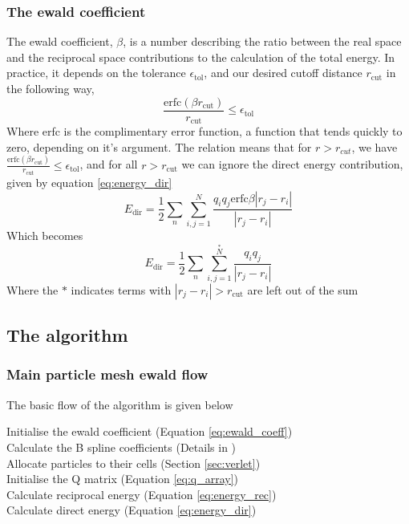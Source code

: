 \documentclass[pdftex,twoside,a4paper]{report}
\begin{document}
\subsubsection{The ewald coefficient}
The ewald coefficient, $\beta$, is a number describing the ratio between the real space and the reciprocal space contributions to the calculation of the total energy. In practice, it depends on the tolerance $\epsilon_\text{tol}$, and our desired cutoff distance $r_{\text{cut}}$ in the following way, \cite{darden:10089} \cite{essmann:8577}\\
\begin{equation}
\frac{\text{erfc}(\beta r_{\text{cut}})}{r_\text{cut}} \leq \epsilon_\text{tol}
\label{eq:ewald_coeff}
\end{equation}
Where erfc is the complimentary error function, a function that tends quickly to zero, depending on it's argument. The relation means that for $r > r_{cut}$, we have $\frac{\text{erfc}(\beta r_{\text{cut}})}{r_\text{cut}} \leq \epsilon_\text{tol}$, and for all $r > r_\text{cut}$ we can ignore the direct energy contribution, given by equation \ref{eq:energy_dir} \cite{essmann:8577}\\
\begin{equation}
E_\text{dir} = \frac{1}{2} \sum_{n} \sum_{i,j = 1} ^N \frac{q_i q_j \text{erfc}{\beta |r_j - r_i|}}{|r_j - r_i|}
\label{eq:energy_dir}
\end{equation}
Which becomes
\begin{equation}
E_\text{dir} = \frac{1}{2} \sum_{n} \sum_{i,j = 1} ^{\overset{*}{N}} \frac{q_i q_j}{|r_j - r_i|}
\label{eq:energy_dir_noerfc}
\end{equation}
Where the $*$ indicates terms with $|r_j - r_i| > r_{\text{cut}}$ are left out of the sum
\subsection{The algorithm}
\subsubsection{Main particle mesh ewald flow}
The basic flow of the algorithm is given below\\ \newline
\begin{algorithm}[H]
\SetLine
Initialise the ewald coefficient (Equation \ref{eq:ewald_coeff})\\
Calculate the B spline coefficients (Details in \cite{essmann:8577})\\
Allocate particles to their cells (Section \ref{sec:verlet})\\
Initialise the Q matrix (Equation \ref{eq:q_array})\\
Calculate reciprocal energy (Equation \ref{eq:energy_rec})\\
Calculate direct energy (Equation \ref{eq:energy_dir})\\
\end{algorithm}
\end{document}
